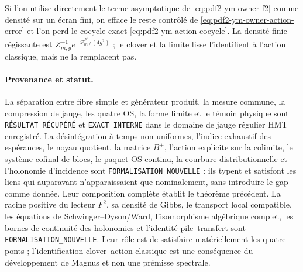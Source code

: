 \begin{falsifier}
Si l’on utilise directement le terme asymptotique de
\eqref{eq:pdf2-ym-owner-f2} comme densité sur un écran fini, on efface le reste
contrôlé de \eqref{eq:pdf2-ym-owner-action-error} et l’on perd le cocycle exact
\eqref{eq:pdf2-ym-action-cocycle}. La densité finie régissante est
$Z_{m,g}^{-1}e^{-\mathcal P_m^{F^2}/(4g^2)}$ ; le clover et la limite lisse
l’identifient à l’action classique, mais ne la remplacent pas.
\end{falsifier}

\paragraph{Provenance et statut.}
La séparation entre fibre simple et générateur produit, la mesure commune, la compression
de jauge, les quatre OS, la forme limite et le témoin physique sont
\texttt{RÉSULTAT\_RÉCUPÉRÉ} et \texttt{EXACT\_INTERNE} dans le domaine de jauge
régulier HMT enregistré. La désintégration à temps non uniformes, l'indice
exhaustif des espérances, le noyau quotient, la matrice $B^+$, l'action explicite
sur la colimite, le système cofinal de blocs, le paquet OS continu, la courbure
distributionnelle et l'holonomie d'incidence sont
\texttt{FORMALISATION\_NOUVELLE} : ils typent et satisfont les liens qui auparavant n'apparaissaient
que nominalement, sans introduire le gap comme donnée. Leur composition complète
établit le théorème précédent.
La racine positive du lecteur $F^2$, sa densité de Gibbs, le transport local compatible,
les équations de Schwinger--Dyson/Ward, l'isomorphisme algébrique complet, les bornes
de continuité des holonomies et l'identité pile--transfert sont
\texttt{FORMALISATION\_NOUVELLE}. Leur rôle est de satisfaire matériellement les quatre
ponts ; l'identification clover--action classique est une conséquence du développement
de Magnus et non une prémisse spectrale.
